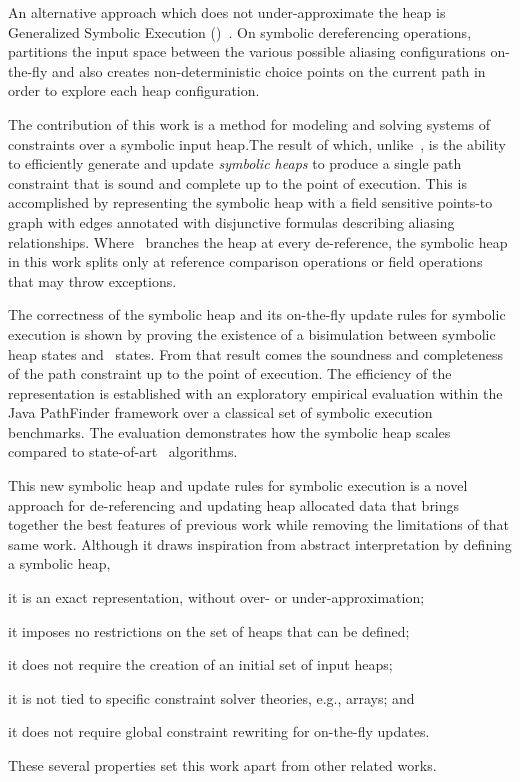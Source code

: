An alternative approach which does not under-approximate the heap is
Generalized Symbolic Execution
(\gsetxt{})~\cite{Cadar:2008,KiasanKunit,GSE03,Rosner:2015}.  On symbolic
dereferencing operations,~\gsetxt{} partitions the input space between the
various possible aliasing configurations on-the-fly and also creates
non-deterministic choice points on the current path in order to
explore each heap configuration. 

The contribution of this work is a method for modeling and solving systems 
of constraints over a symbolic input heap.The
result of which, unlike~\gsetxt{}, is the ability to efficiently generate
and update \emph{symbolic heaps} to produce a single path constraint
that is sound and complete up to the point of execution. This is
accomplished by representing the symbolic heap with a field sensitive
points-to graph with edges annotated with disjunctive formulas
describing aliasing relationships. Where~\gsetxt{} branches the heap at every
de-reference, the symbolic heap in this work splits only at reference
comparison operations or field operations that may throw exceptions.

The correctness of the symbolic heap and its on-the-fly update rules
for symbolic execution is shown by proving the existence of a
bisimulation between symbolic heap states and~\gsetxt{} states. From that
result comes the soundness and completeness of the path constraint up
to the point of execution.  The efficiency of the representation is
established with an exploratory empirical evaluation within the Java
PathFinder framework over a classical set of symbolic execution
benchmarks. The evaluation demonstrates how the symbolic heap scales
compared to state-of-art~\gsetxt{} algorithms.

This new symbolic heap and update rules for symbolic execution is a
novel approach for de-referencing and updating heap allocated data
that brings together the best features of previous work while removing
the limitations of that same work. Although it draws inspiration from
abstract interpretation by defining a symbolic heap,
\begin{compactitem}
  \item it is an exact representation, without over- or under-approximation;
  \item it imposes no restrictions on the set of heaps that can be defined;
  \item it does not require the creation of an initial set of input heaps;
  \item it is not tied to specific constraint solver theories, e.g., arrays; and
  \item it does not require global constraint rewriting for on-the-fly updates.
\end{compactitem}
These several properties set this work apart from other related works.


